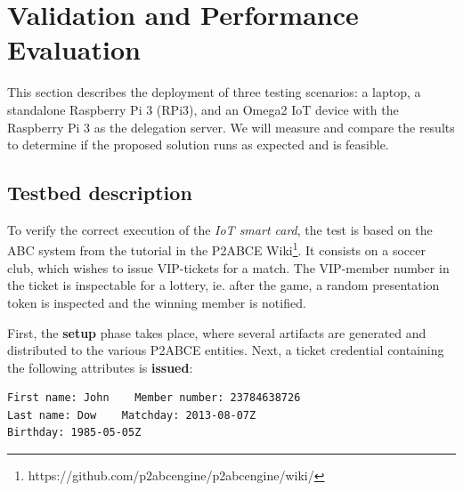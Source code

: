 \section{Validation and Performance Evaluation}\label{ch:validation}


This section describes the deployment of three testing scenarios: a laptop, a standalone Raspberry Pi 3 (RPi3), and an Omega2 IoT device with the Raspberry Pi 3 as the delegation server. We will measure and compare the results to determine if the proposed solution runs as expected and is feasible.

\subsection{Testbed description}



To verify the correct execution of the \textit{IoT smart card}, the test is based on the ABC system from the tutorial in the P2ABCE Wiki\footnote{{https://github.com/p2abcengine/p2abcengine/wiki/}}. It consists on a soccer club, which wishes to issue VIP-tickets for a match. The VIP-member number in the ticket is inspectable for a lottery, ie. after the game, a random presentation token is inspected and the winning member is notified.

First, the \textbf{setup} phase takes place, where several artifacts are generated and distributed to the various P2ABCE entities. Next, a ticket credential containing the following attributes is \textbf{issued}:
\begin{Verbatim}[fontsize=\footnotesize]
First name: John	Member number: 23784638726	
Last name: Dow	  Matchday: 2013-08-07Z
Birthday: 1985-05-05Z
\end{Verbatim}


